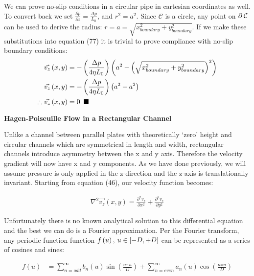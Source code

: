 \documentclass[titlepage]{article}
\begin{document}
\noindent We can prove no-slip conditions in a circular pipe in  cartesian coordinates as well. To convert back we set $\displaystyle\frac{\partial{p}}{\partial{z}}=\displaystyle\frac{\Delta{p}}{L_{0}}$, and $r^2=a^2$. Since $\mathcal{C}$ is a circle, any point on $\partial\hspace*{2pt}\mathcal{C}$ can be used to derive the radius: 
$r=a=\sqrt{x_{boundary}^2+y_{boundary}^2}$. If we make these substitutions into equation (77) it is trivial to prove compliance with no-slip boundary conditions:
\begin{align}
    \vec{v_{z}}\left(x,y\right) &= -\left(\displaystyle\frac{\Delta{p}}{4\eta{L_{0}}}\right)\left(a^2-\left(\sqrt{x_{boundary}^2+y_{boundary}^2}\right)^2\right) \\
    \vec{v_{z}}\left(x,y\right) &= -\left(\displaystyle\frac{\Delta{p}}{4\eta{L_{0}}}\right)\left(a^2-a^2\right) \\
    \therefore \vec{v_{z}}\left(x,y\right) &= 0 \hspace*{5pt}\blacksquare
\end{align}

\newpage
\begin{center}
    \large
    \textbf{Hagen-Poiseuille Flow in a Rectangular Channel} \\
\end{center}
\noindent Unlike a channel between parallel plates with theoretically `zero' height and circular channels which are symmetrical in length and width, rectangular channels introduce asymmetry between the x and y axis. Therefore the velocity gradient will now have x and y components. As we have done previously, we will assume pressure is only applied in the z-direction and the z-axis is translationally invariant. Starting from equation (46), our velocity function becomes: 

\begin{align}
    \nabla^2\vec{v_{z}}\left(x,y\right) = \displaystyle\frac{\partial^2{v_{z}}}{\partial{x^2}}+\displaystyle\frac{\partial^2{v_{z}}}{\partial{y^2}}
\end{align}

\noindent Unfortunately there is no known analytical solution to this differential equation and the best we can do is a Fourier approximation. Per the Fourier transform, any periodic function function $f\left(u\right), \hspace*{2pt} u \in \left[-D, +D\right]$ can be represented as a series of cosines and sines:

\begin{align}
    f\left(u\right) &= \sum_{n=odd}^{\infty}b_{n}\left(u\right)\sin(\displaystyle\frac{n\pi{u}}{D}) + \sum_{n=even}^{\infty}a_{n}\left(u\right)\cos(\displaystyle\frac{n\pi{u}}{D})
\end{align}
\end{document}
